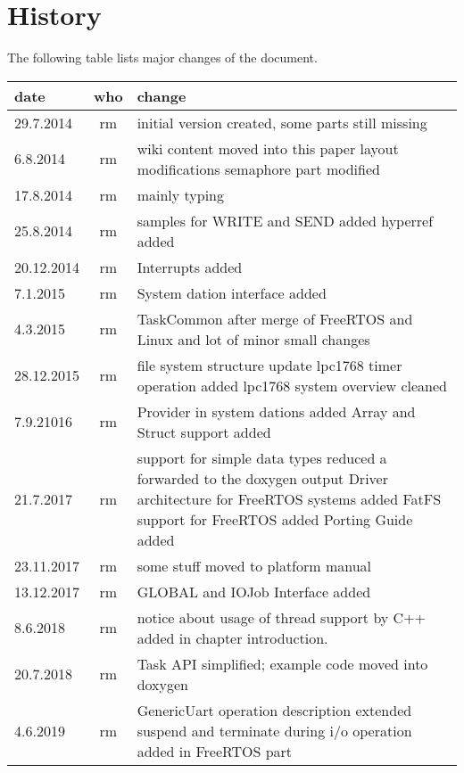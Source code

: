 \chapter*{History}
The following table lists major changes of the document.

\begin{tabular}{|l|c|p{10cm}|}
\hline
date & who & change \\
\hline
29.7.2014 & rm & initial version created, some parts still missing \\
6.8.2014 & rm & wiki content moved into this paper \newline
                layout modifications\newline
                semaphore part modified\\
17.8.2014 & rm & mainly typing \\
25.8.2014 & rm & samples for WRITE and SEND added \newline
		 hyperref added\\
20.12.2014 & rm & Interrupts added \\
7.1.2015 & rm & System dation interface added \\
4.3.2015 & rm &  TaskCommon after merge of FreeRTOS and Linux \newline
and lot of minor small changes \\
28.12.2015 & rm & file system structure update \newline
                  lpc1768 timer operation added \newline
                  lpc1768 system overview cleaned \\
7.9.21016 & rm & Provider in system dations added\newline
                 Array and Struct support added\\
21.7.2017 & rm & support for simple data types reduced
                 a forwarded to the doxygen output \newline
                 Driver architecture for FreeRTOS systems added \newline
                 FatFS support for FreeRTOS added \newline
                 Porting Guide added \\
23.11.2017 & rm & some stuff moved to platform manual\\
13.12.2017 & rm & GLOBAL and IOJob Interface added \\
8.6.2018 & rm & notice about usage of thread support by C++ added in chapter
                introduction.\\
20.7.2018 & rm & Task API simplified; example code moved into doxygen \\
4.6.2019 & rm & GenericUart operation description extended \newline
                suspend and terminate during i/o operation added in FreeRTOS part\\
\hline
\end{tabular} 

